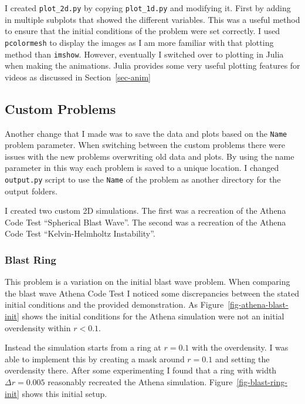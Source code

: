 \documentclass[
  letterpaper,
]{article}
\begin{document}
I created \texttt{plot\_2d.py} by copying \texttt{plot\_1d.py} and
modifying it. First by adding in multiple subplots that showed the
different variables. This was a useful method to ensure that the initial
conditions of the problem were set correctly. I used \texttt{pcolormesh}
to display the images as I am more familiar with that plotting method
than \texttt{imshow}. However, eventually I switched over to plotting in
Julia when making the animations. Julia provides some very useful
plotting features for videos as discussed in Section~\ref{sec-anim}

\subsection{Custom Problems}\label{custom-problems}

Another change that I made was to save the data and plots based on the
\texttt{Name} problem parameter. When switching between the custom
problems there were issues with the new problems overwriting old data
and plots. By using the name parameter in this way each problem is saved
to a unique location. I changed \texttt{output.py} script to use the
\texttt{Name} of the problem as another directory for the output
folders.

I created two custom 2D simulations. The first was a recreation of the
Athena Code Test ``Spherical Blast Wave''. The second was a recreation
of the Athena Code Test ``Kelvin-Helmholtz Instability''.

\subsubsection{Blast Ring}\label{sec-blast-ring}

This problem is a variation on the initial blast wave problem. When
comparing the blast wave Athena Code Test I noticed some discrepancies
between the stated initial conditions and the provided demonstration. As
Figure~\ref{fig-athena-blast-init} shows the initial conditions for the
Athena simulation were not an initial overdensity within \(r<0.1\).

Instead the simulation starts from a ring at \(r=0.1\) with the
overdensity. I was able to implement this by creating a mask around
\(r=0.1\) and setting the overdensity there. After some experimenting I
found that a ring with width \(\Delta r = 0.005\) reasonably recreated
the Athena simulation. Figure~\ref{fig-blast-ring-init} shows this
initial setup.
\end{document}
